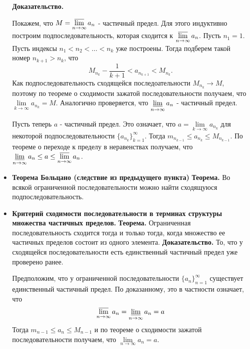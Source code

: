 \documentclass[12pt,a4paper]{article}
\begin{document}
\begin{itemize}
\textbf{Доказательство.}

Покажем, что $M = \varlimsup\limits_{n \to \infty}{a_n}$ - частичный предел. Для этого индуктивно построим подпоследовательность, которая сходится к $\varlimsup\limits_{n \to \infty}{a_n}$. Пусть $n_1 = 1$. Пусть индексы $n_1 < n_2 < \ldots < n_k$ уже построены. Тогда подберем такой номер $n_{k+1} > n_k$, что 
\[
M_{n_k} - \frac{1}{k+1} < 
a_{n_{k+1}} < 
M_{n_k}.
\]
Как подпоследовательность сходящейся последоательности $M_{n_k} \to M$, поэтому по теореме о сходимости зажатой последовательности получаем, что $\lim\limits_{k \to \infty}{a_{n_k}} = M$. Аналогично проверяется, что $\varliminf\limits_{n \to \infty}{a_n}$ - частичный предел.

Пусть теперь $a$ - частичный предел. Это означает, что $a = \lim\limits_{k \to \infty}{a_{n_k}}$ для некоторой подпоследовательности $\{a_{n_k}\}_{k=1}^\infty$. Тогда $m_{n_{k-1}} \leq a_{n_k} \leq M_{n_{k-1}}$. По теореме о переходе к пределу в неравенствах получаем, что $\varliminf\limits_{n \to \infty}{a_n} \leq a \leq \varlimsup\limits_{n \to \infty}{a_n}$.

\item \textbf{Теорема Больцано (следствие из предыдущего пункта)}
\textbf{Теорема.} Во всякой ограниченной последовательности можно найти сходящуюся подпоследовательность.

\item \textbf{Критерий сходимости последовательности в терминах структуры множества частичных пределов.}
\textbf{Теорема.} Ограниченная последовательность сходится тогда и только тогда, когда множество ее частичных пределов состоит из одного элемента.
\textbf{Доказательство.}
То, что у сходящейся последовательности есть единственный частичный предел уже проверено ранее.

Предположим, что у ограниченной последовательности $\{a_n\}_{n=1}^\infty$ существует единственный частичный предел. По доказанному, это в частности означает, что 
\[
\varlimsup_{n \to \infty}{a_n} = 
\varliminf_{n \to \infty}{a_n} = 
a
\]
Тогда $m_{n-1} \leq a_n \leq M_{n-1}$ и по теореме о сходимости зажатой последовательности получаем, что $\lim\limits_{n \to \infty}{a_n} = a$.
\end{itemize}
\end{document}
